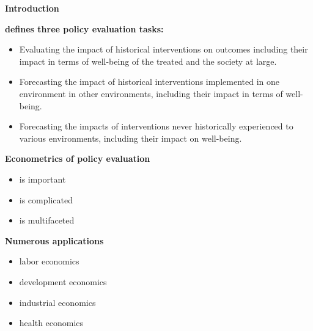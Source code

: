 \begin{frame}\begin{center}
	\LARGE\textbf{Introduction}
\end{center}\end{frame}
\begin{frame}
	\textbf{ defines three policy evaluation tasks:}
	\begin{itemize}\setlength\itemsep{1em}
		\item Evaluating the impact of historical interventions on outcomes including their impact in terms of well-being of the treated and the society at large.
		\item Forecasting the impact of historical interventions implemented in one environment in other environments, including their impact in terms of well-being.
		\item Forecasting the impacts of interventions never historically experienced to various environments, including their impact on well-being.
	\end{itemize}
\end{frame}
\begin{frame}
	\textbf{Econometrics of policy evaluation}\\\vspace{0.3cm}
	\begin{itemize}\setlength\itemsep{1em}
		\item is important
		\item is complicated
		\item is multifaceted
	\end{itemize}
\end{frame}
\begin{frame}
\textbf{Numerous applications}\\\vspace{0.3cm}

	\begin{itemize}\setlength\itemsep{1em}
		\item labor economics
		\item development economics
		\item industrial economics
		\item health economics
	\end{itemize}
\end{frame}
